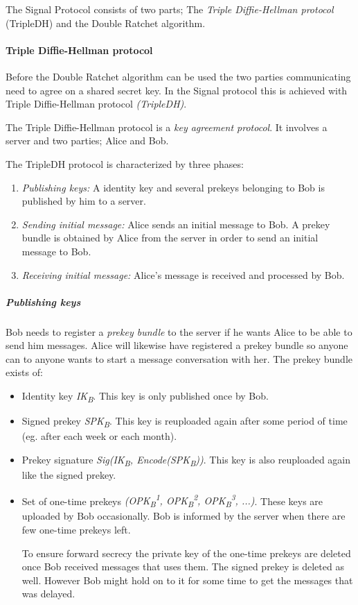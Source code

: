 The Signal Protocol consists of two parts; The \emph{Triple Diffie-Hellman protocol} (TripleDH) and the Double Ratchet algorithm.

\paragraph{Triple Diffie-Hellman protocol}\label{tripledh}
Before the Double Ratchet algorithm can be used the two parties communicating need to agree on a shared secret key. In the Signal protocol this is achieved with Triple Diffie-Hellman protocol \emph{(TripleDH)}.

The Triple Diffie-Hellman protocol is a \emph{key agreement protocol}. It involves a server and two parties; Alice and Bob. 

The TripleDH protocol is characterized by three phases:

\begin{enumerate}
	\item \emph{Publishing keys:} A identity key and several prekeys belonging to Bob is published by him to a server.
	\item \emph{Sending initial message:} Alice sends an initial message to Bob. A prekey bundle is obtained by Alice from the server in order to send an initial message to Bob.
	\item \emph{Receiving initial message:} Alice's message is received and processed by Bob.
\end{enumerate}

\subparagraph{Publishing keys}
Bob needs to register a \emph{prekey bundle} to the server if he wants Alice to be able to send him messages. Alice will likewise have registered a prekey bundle so anyone can to anyone wants to start a message conversation with her.  
The prekey bundle exists of:

\begin{itemize}
	\item Identity key \emph{IK\textsubscript{B}}. This key is only published once by Bob.
	\item Signed prekey \emph{SPK\textsubscript{B}}. This key is reuploaded again after some period of time (eg. after each week or each month). 
	\item Prekey signature \emph{Sig(IK\textsubscript{B}, Encode(SPK\textsubscript{B}))}. This key is also reuploaded again like the signed prekey.
	\item Set of one-time prekeys \emph{(OPK\textsubscript{B}\textsuperscript{1}, OPK\textsubscript{B}\textsuperscript{2}, OPK\textsubscript{B}\textsuperscript{3}, ...)}. These keys are uploaded by Bob occasionally. Bob is informed by the server when there are few one-time prekeys left. 
	
	To ensure forward secrecy the private key of the one-time prekeys are deleted once Bob received messages that uses them. The signed prekey is deleted as well. However Bob might hold on to it for some time to get the messages that was delayed.  
\end{itemize}

